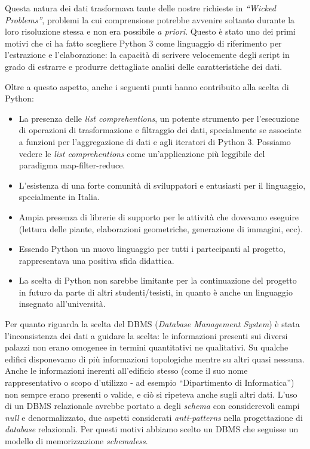 \documentclass[12pt]{report}
\begin{document}
Questa natura dei dati trasformava tante delle nostre richieste in
\textit{``Wicked Problems''}, problemi la cui comprensione potrebbe
avvenire soltanto durante la loro risoluzione stessa e non era
possibile \textit{a priori}. Questo è stato uno dei primi motivi che
ci ha fatto scegliere Python 3 come linguaggio di riferimento per
l'estrazione e l'elaborazione: la capacità di scrivere velocemente
degli script in grado di estrarre e produrre dettagliate analisi delle
caratteristiche dei dati. 

Oltre a questo aspetto, anche i seguenti punti hanno contribuito
alla scelta di Python:
\begin{itemize}
  \item La presenza delle \textit{list comprehentions}, un potente
strumento per l'esecuzione di operazioni di trasformazione e
filtraggio dei dati, specialmente se associate a funzioni per
l'aggregazione di dati e agli iteratori di Python 3. Possiamo vedere
le \textit{list comprehentions} come un'applicazione più leggibile del
paradigma map-filter-reduce.
  \item L'esistenza di una forte comunità di sviluppatori e entusiasti
per il linguaggio, specialmente in Italia.
  \item Ampia presenza di librerie di supporto per le attività che
dovevamo eseguire (lettura delle piante, elaborazioni geometriche,
generazione di immagini, ecc).
  \item Essendo Python un nuovo linguaggio per tutti i partecipanti al
progetto, rappresentava una positiva sfida didattica.
  \item La scelta di Python non sarebbe limitante per la continuazione
del progetto in futuro da parte di altri studenti/tesisti, in quanto è
anche un linguaggio insegnato all'università.
\end{itemize}

Per quanto riguarda la scelta del DBMS (\textit{Database Management
System}) è stata l'inconsistenza dei dati a guidare la scelta: le
informazioni presenti sui diversi palazzi non erano omogenee in
termini quantitativi ne qualitativi. Su qualche edifici disponevamo di
più informazioni topologiche mentre su altri quasi nessuna. Anche le
informazioni inerenti all'edificio stesso (come il suo nome rappresentativo o
scopo d'utilizzo - ad esempio ``Dipartimento di Informatica'') non sempre
erano presenti o valide, e ciò si ripeteva anche sugli altri dati. L'uso di un
DBMS relazionale avrebbe portato a degli \textit{schema} con considerevoli
campi \textit{null} e denormalizzato, due aspetti considerati
\textit{anti-patterns} nella progettazione di \textit{database} relazionali.
Per questi motivi abbiamo scelto un DBMS che seguisse un modello di
memorizzazione \textit{schemaless}. 
\end{document}
